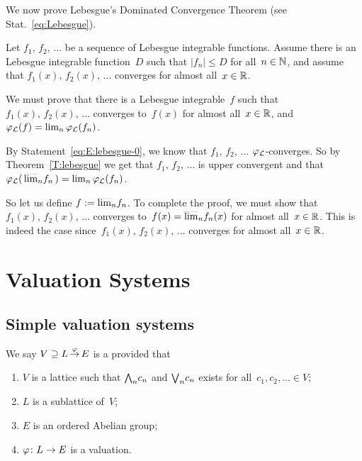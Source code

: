 \documentclass[main.tex]{subfiles}
\begin{document}
\vspace{.3em}
\noindent
We now prove Lebesgue's Dominated Convergence Theorem
(see Stat.~\eqref{eq:Lebesgue}).

Let $f_1,\,f_2,\,\dotsc$ be a sequence of Lebesgue integrable functions.
Assume there is an Lebesgue integrable function~$D$ such that
$|f_n|\leq D$ for all~$n\in\mathbb{N}$,
and assume that $f_1(x),\,f_2(x),\,\dotsc$ converges
for almost all~$x\in\mathbb{R}$.

We must prove that there is a Lebesgue integrable~$f$
such that $f_1(x),\,f_2(x),\,\dotsc$
converges to~$f(x)$ for almost all~$x\in\mathbb{R}$,
and $\varphi_{\mathcal{L}}(f) = \lim_n \varphi_{\mathcal{L}}(f_n)$.

By Statement~\eqref{eq:E:lebesgue-0},
we know that $f_1,\,f_2,\,\dotsc$
$\varphi_{\mathcal{L}}$-converges.
So by Theorem~\ref{T:lebesgue} we get that
$f_1,\,f_2,\,\dotsc$
is upper convergent
and that $\varphi_{\mathcal{L}}(\,\smash{\overline{\lim}_{n}}f_n\,) = \lim_n \varphi_{\mathcal{L}}(f_n)$.

So let us define $f:= \smash{\overline{\lim}_{n}}f_n$.
To complete the proof,
we must show that $f_1(x),\,f_2(x),\,\dotsc$
converges to~$f(x)=\smash{\overline{\lim}_{n}}f_n(x)$
for almost all~$x\in \mathbb{R}$.
This is indeed the case since~$f_1(x),\,f_2(x),\,\dotsc$
converges for almost all~$x\in\mathbb{R}$.




\section{Valuation Systems}
\label{S:valuation-systems}
\subsection{Simple valuation systems}
%
%
\begin{dfn}
\label{D:simple-system}
We say $V \supseteq L\,\smash{\stackrel{\varphi}{\rightarrow}}\,E$
 is a 
provided that
\begin{enumerate}
\item \label{D:simple-system-1}
$V$ is a lattice
such that $\textstyle{\bigwedge}_n c_n$ and $\textstyle{\bigvee}_n c_n$ exists for all~$c_1,c_2,\dotsc\in V$;
\item \label{D:simple-system-2}
$L$ is a sublattice of~$V$;
\item \label{D:simple-system-3}
$E$ is an ordered Abelian group;
\item \label{D:simple-system-4}
$\varphi\colon L\rightarrow E$ is a valuation.
\end{enumerate}
\end{dfn}
\end{document}
